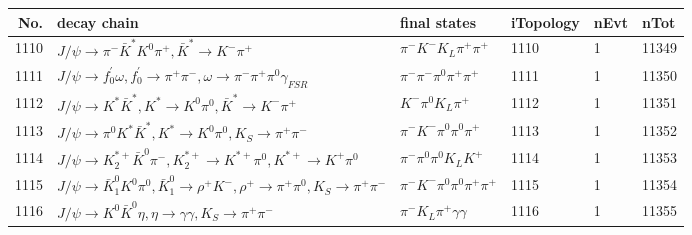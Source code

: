 \begin{table}[htbp] 
\begin{center}
\begin{small}
\begin{tabular}{rlllll}\hline\hline
 No. & decay chain & final states &  iTopology & nEvt & nTot \\\hline
1110&$J/\psi       \rightarrow \pi^{-}        \bar{K}^{*}   K^{0}          \pi^{+}        , \bar{K}^{*}    \rightarrow K^{-}          \pi^{+}        $&$\pi^{-}        K^{-}          K_{L}          \pi^{+}        \pi^{+}        $& 1110&    1&11349\\
1111&$J/\psi       \rightarrow f^{'}_{0}     \omega         , f^{'}_{0}      \rightarrow \pi^{+}        \pi^{-}        , \omega          \rightarrow \pi^{-}        \pi^{+}        \pi^{0}        \gamma_{FSR} $&$\pi^{-}        \pi^{-}        \pi^{0}        \pi^{+}        \pi^{+}        $& 1111&    1&11350\\
1112&$J/\psi       \rightarrow K^{*}          \bar{K}^{*}   , K^{*}           \rightarrow K^{0}          \pi^{0}        , \bar{K}^{*}    \rightarrow K^{-}          \pi^{+}        $&$K^{-}          \pi^{0}        K_{L}          \pi^{+}        $& 1112&    1&11351\\
1113&$J/\psi       \rightarrow \pi^{0}        K^{*}          \bar{K}^{*}   , K^{*}           \rightarrow K^{0}          \pi^{0}        , K_{S}           \rightarrow \pi^{+}        \pi^{-}        $&$\pi^{-}        K^{-}          \pi^{0}        \pi^{0}        \pi^{+}        $& 1113&    1&11352\\
1114&$J/\psi       \rightarrow K_2^{*+}       \bar{K}^{0}   \pi^{-}        , K_2^{*+}        \rightarrow K^{*+}         \pi^{0}        , K^{*+}          \rightarrow K^{+}          \pi^{0}        $&$\pi^{-}        \pi^{0}        \pi^{0}        K_{L}          K^{+}          $& 1114&    1&11353\\
1115&$J/\psi       \rightarrow \bar{K}_1^{0} K^{0}          \pi^{0}        , \bar{K}_1^{0}  \rightarrow \rho^{+}      K^{-}          , \rho^{+}       \rightarrow \pi^{+}        \pi^{0}        , K_{S}           \rightarrow \pi^{+}        \pi^{-}        $&$\pi^{-}        K^{-}          \pi^{0}        \pi^{0}        \pi^{+}        \pi^{+}        $& 1115&    1&11354\\
1116&$J/\psi       \rightarrow K^{0}          \bar{K}^{0}   \eta          , \eta           \rightarrow \gamma       \gamma       , K_{S}           \rightarrow \pi^{+}        \pi^{-}        $&$\pi^{-}        K_{L}          \pi^{+}        \gamma       \gamma       $& 1116&    1&11355\\

\end{tabular}
\end{small}
\end{center}
\end{table}
